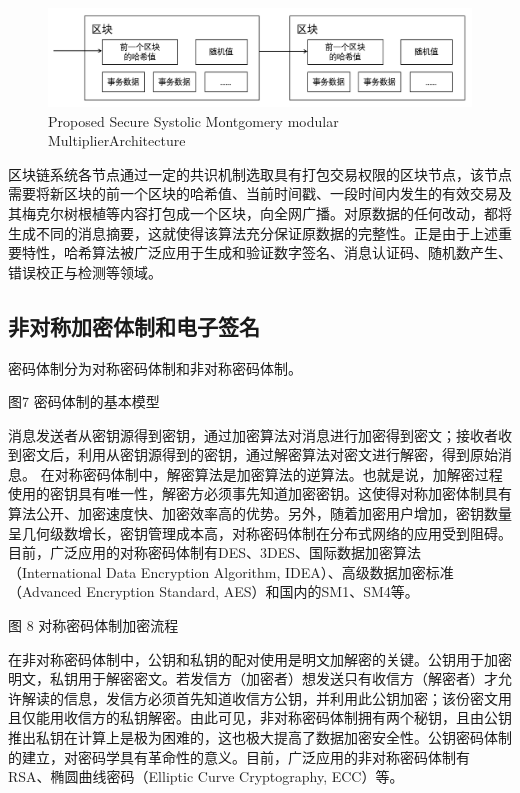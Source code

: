 \begin{figure}
\centering	
\includegraphics [width=0.75，height=2.5]{figures/hashchain.png}
\caption{Proposed Secure Systolic Montgomery modular MultiplierArchitecture}
\label{fig:hashchain}
\end{figure}

区块链系统各节点通过一定的共识机制选取具有打包交易权限的区块节点，该节点需要将新区块的前一个区块的哈希值、当前时间戳、一段时间内发生的有效交易及其梅克尔树根植等内容打包成一个区块，向全网广播。对原数据的任何改动，都将生成不同的消息摘要，这就使得该算法充分保证原数据的完整性。正是由于上述重要特性，哈希算法被广泛应用于生成和验证数字签名、消息认证码、随机数产生、错误校正与检测等领域。

\subsection{非对称加密体制和电子签名}

密码体制分为对称密码体制和非对称密码体制。

图7  密码体制的基本模型

消息发送者从密钥源得到密钥，通过加密算法对消息进行加密得到密文；接收者收到密文后，利用从密钥源得到的密钥，通过解密算法对密文进行解密，得到原始消息。
在对称密码体制中，解密算法是加密算法的逆算法。也就是说，加解密过程使用的密钥具有唯一性，解密方必须事先知道加密密钥。这使得对称加密体制具有算法公开、加密速度快、加密效率高的优势。另外，随着加密用户增加，密钥数量呈几何级数增长，密钥管理成本高，对称密码体制在分布式网络的应用受到阻碍。目前，广泛应用的对称密码体制有DES、3DES、国际数据加密算法（International Data Encryption Algorithm, IDEA）、高级数据加密标准（Advanced Encryption Standard, AES）和国内的SM1、SM4等。
 
图 8  对称密码体制加密流程

在非对称密码体制中，公钥和私钥的配对使用是明文加解密的关键。公钥用于加密明文，私钥用于解密密文。若发信方（加密者）想发送只有收信方（解密者）才允许解读的信息，发信方必须首先知道收信方公钥，并利用此公钥加密；该份密文用且仅能用收信方的私钥解密。由此可见，非对称密码体制拥有两个秘钥，且由公钥推出私钥在计算上是极为困难的，这也极大提高了数据加密安全性。公钥密码体制的建立，对密码学具有革命性的意义。目前，广泛应用的非对称密码体制有RSA、椭圆曲线密码（Elliptic Curve Cryptography, ECC）等。
 
